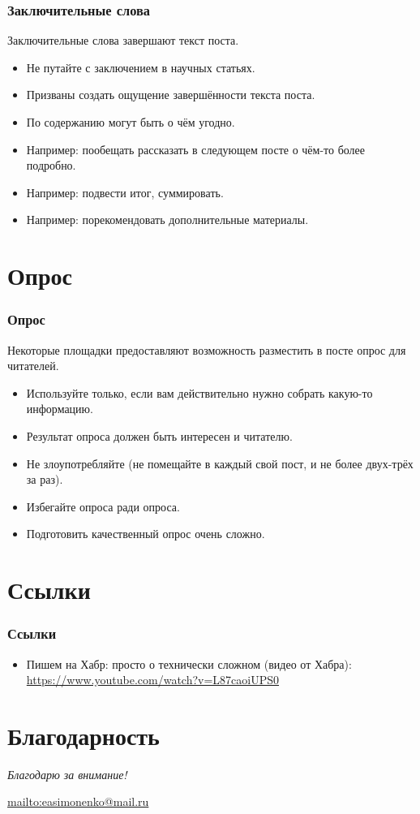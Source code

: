\documentclass[12pt]{beamer}
\begin{document}
\begin{frame}
  \frametitle{Заключительные слова}
  Заключительные слова завершают текст поста.
  \begin{itemize}
  \item Не путайте с заключением в научных статьях.
  \item Призваны создать ощущение завершённости текста поста.
  \item По содержанию могут быть о чём угодно.
  \item Например: пообещать рассказать в следующем посте о чём-то более подробно.
  \item Например: подвести итог, суммировать.
  \item Например: порекомендовать дополнительные материалы.
  \end{itemize}
\end{frame}

\section{Опрос}

\begin{frame}
  \frametitle{Опрос}
  Некоторые площадки предоставляют возможность разместить в посте опрос для читателей.
  \begin{itemize}
  \item Используйте только, если вам действительно нужно собрать какую-то информацию.
  \item Результат опроса должен быть интересен и читателю.
  \item Не злоупотребляйте (не помещайте в каждый свой пост, и не более двух-трёх за раз).
  \item Избегайте опроса ради опроса.
  \item Подготовить качественный опрос очень сложно.
  \end{itemize}
\end{frame}

\section{Ссылки}

\begin{frame}
  \frametitle{Ссылки}
  \begin{itemize}
  \item Пишем на Хабр: просто о технически сложном (видео от Хабра):
    \url{https://www.youtube.com/watch?v=L87caoiUPS0}
  \end{itemize}
\end{frame}

\section*{Благодарность}

\begin{frame}
  \center
  \textit{Благодарю за внимание!}

  \textbf{\textsl{\inserttitle}}

  \insertauthor

  \url{mailto:easimonenko@mail.ru}

  \insertinstitute
\end{frame}
\end{document}

